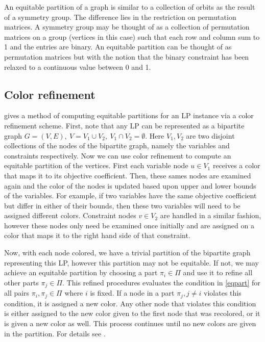 \documentclass[runningheads]{llncs}
\numberwithin{defn}{section} %
\begin{document}
An equitable partition of a graph is similar to a collection of orbits as the result of a symmetry group.  The difference lies in the restriction on permutation matrices.  A symmetry group may be thought of as a collection of permutation matrices on a group (vertices in this case) such that each row and column sum to 1 and the entries are binary.  An equitable partition can be thought of as permutation matrices but with the notion that the binary constraint has been relaxed to a continuous value between 0 and 1.

\subsection{Color refinement}
\cite{grohe2014dimension} gives a method of computing equitable partitions for an LP instance via a color refinement scheme.  First, note that any LP can be represented as a bipartite graph $G = (V, E), \ V = V_1 \cup V_2, \ V_1 \cap V_2 = \emptyset$.  Here $V_1, V_2$ are two disjoint collections of the nodes of the bipartite graph, namely the variables and constraints respectively.  Now we can use color refinement to compute an equitable partition of the vertices.  First each variable node $u \in V_1$ receives a color that maps it to its objective coefficient.  Then, these sames nodes are examined again and the color of the nodes is updated based upon upper and lower bounds of the variables.  For example, if two variables have the same objective coefficient but differ in either of their bounds, then these two variables will need to be assigned different colors.  Constraint nodes $v \in V_2$ are handled in a similar fashion, however these nodes only need be examined once initially and are assigned on a color that maps it to the right hand side of that constraint.

Now, with each node colored, we have a trivial partition of the bipartite graph representing this LP, however this partition may not be equitable.  If not, we may achieve an equitable partition by choosing a part $\pi_i \in \Pi$ and use it to refine all other parts $\pi_j \in \Pi$.  This refined procedures evaluates the condition in \eqref{eqpart} for all pairs $\pi_i, \pi_j \in \Pi$ where $i$ is fixed.  If a node in a part $\pi_j, j \neq i$ violates this condition, it is assigned a new color.  Any other node that violates this condition is either assigned to the new color given to the first node that was recolored, or it is given a new color as well.  This process continues until no new colors are given in the partition.  For details see \cite{grohe2014dimension}.
%
%
%
 
 
 
 
\end{document}
